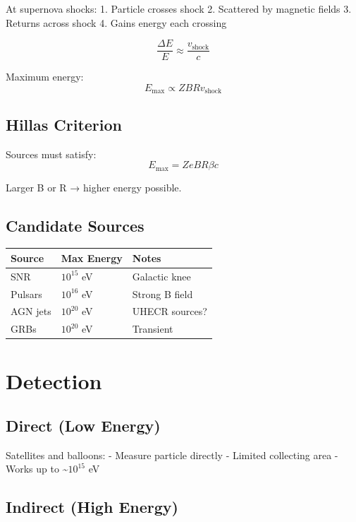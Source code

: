 \documentclass[
  11pt,
  letterpaper,
  twoside,
  openright]{book}
\begin{document}
At supernova shocks: 1. Particle crosses shock 2. Scattered by magnetic
fields 3. Returns across shock 4. Gains energy each crossing

\[
\frac{\Delta E}{E} \approx \frac{v_{\text{shock}}}{c}
\]

Maximum energy: \[
E_{\text{max}} \propto Z B R v_{\text{shock}}
\]

\subsection{Hillas Criterion}\label{hillas-criterion}

Sources must satisfy: \[
E_{\text{max}} = Z e B R \beta c
\]

Larger B or R → higher energy possible.

\subsection{Candidate Sources}\label{candidate-sources}

\begin{longtable}[]{@{}lll@{}}
\toprule\noalign{}
Source & Max Energy & Notes \\
\midrule\noalign{}
\endhead
\bottomrule\noalign{}
\endlastfoot
SNR & \(10^{15}\) eV & Galactic knee \\
Pulsars & \(10^{16}\) eV & Strong B field \\
AGN jets & \(10^{20}\) eV & UHECR sources? \\
GRBs & \(10^{20}\) eV & Transient \\
\end{longtable}

\section{Detection}\label{detection-1}

\subsection{Direct (Low Energy)}\label{direct-low-energy}

Satellites and balloons: - Measure particle directly - Limited
collecting area - Works up to \textasciitilde{}\(10^{15}\) eV

\subsection{Indirect (High Energy)}\label{indirect-high-energy}
\end{document}
